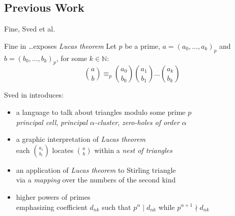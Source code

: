 \documentclass[10pt,serif, professionalfont]{beamer}
\begin{document}
\subsection{Previous Work}

\begin{frame}{Fine, Sved et al.}

    \begin{block}{Fine in \ldots exposes \emph{Lucas theorem}}
        Let $p$ be a prime, $a=(a_{0},\ldots,a_{k})_{p}$ and $b=(b_{0},\ldots,b_{k})_{p}$, for some $k\in\mathbb{N}$:
        \begin{displaymath}
            {{a}\choose{b}} \equiv_{p} {{a_{0}}\choose{b_{0}}}{{a_{1}}\choose{b_{1}}}
                \ldots{{a_{k}}\choose{b_{k}}}
        \end{displaymath}
    \end{block}
    \pause
    \begin{block}{Sved in \cite{Sved1998} introduces:}
        \begin{itemize}
            \item {\normalsize a language to talk about triangles modulo some prime $p$}\\
                \footnotesize{\emph{principal cell}, \emph{principal $\alpha$-cluster}, \emph{zero-holes of order $\alpha$}}
            \item {\normalsize a graphic interpretation of \emph{Lucas theorem} }\\
                \footnotesize{each ${{a_i}\choose{b_i}}$ locates ${{a}\choose{b}}$ within a \emph{nest of triangles}}
            \item {\normalsize an application of \emph{Lucas theorem} to Stirling triangle}\\
                \footnotesize{via a \emph{mapping} over the numbers of the second kind}
            \item {\normalsize higher powers of primes}\\
                \footnotesize{emphasizing coefficient $d_{nk}$ such that 
                    $p^{\alpha}\mid d_{nk}$ while $p^{\alpha+1}\nmid d_{nk}$}
        \end{itemize}
    \end{block}
\end{frame}
\end{document}
